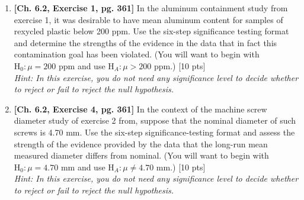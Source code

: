 \documentclass[11pt]{article}\usepackage[]{graphicx}\usepackage[]{color}
\begin{document}
{\begin{enumerate}
\begin{Schunk}
\begin{Soutput}
| Diameter| Frequency|
|--------:|---------:|
|     4.52|         1|
|     4.66|         4|
|     4.67|         7|
|     4.68|         7|
|     4.69|        14|
|     4.70|         9|
|     4.71|         4|
|     4.72|         4|
\end{Soutput}
\end{Schunk}
  
      \begin{enumerate}
          \item Compute the sample mean and standard deviation for these data. [5 pts]
          \item Use your sample values from a) and make a 98\% two-sided confidence interval for the mean diameter of such screws as measured by this students with these calipers. [ 5 pts]
          \item Repeat part b) using 99\% confidence. How does this interval compare with the one from b)? [5 pts]
          \item Use your values from a) and find a 98\% lower confidence bound for the mean diameter. (Find a # such that $(\#, \infty)$ is a 98\% confidence interval.) How does this value compare to the lower endpoint of your interval from b)? [5 pts]
          \item Repeat part d) using 99\% confidence. How does the value computed here compare with your answer for d)? [5 pts]
          \item Interpret your interval from b) for someone with little statistical background.[ 5 pts]
    \end{enumerate}
    
\item\textbf {[Ch. 6.2, Exercise 1, pg. 361]} In the aluminum containment study from exercise 1, it was desirable to have mean aluminum content for samples of rexycled plastic below 200 ppm. Use the six-step significance testing format and determine the strengths of the evidence in the data that in fact this contamination goal has been violated. (You will want to begin with $\text{H}_0: \mu = 200$ ppm and use $\text{H}_A: \mu > 200$ ppm.) [10 pts]\\
\emph{Hint: In this exercise, you do not need any significance level to decide whether to reject or fail to reject the null hypothesis.}

\item\textbf {[Ch. 6.2, Exercise 4, pg. 361]} In the context of the machine screw diameter study of exercise 2 from, suppose that the nominal diameter of such screws is 4.70 mm. Use the six-step significance-testing format and assess the strength of the evidence provided by the data that the long-run mean measured diameter differs from nominal. (You will want to begin with $\text{H}_0: \mu = 4.70$ mm and use $\text{H}_A: \mu \not= 4.70$ mm.) [10 pts]\\
\emph{Hint: In this exercise, you do not need any significance level to decide whether to reject or fail to reject the null hypothesis.}
  

\end{enumerate}}
\end{document}
